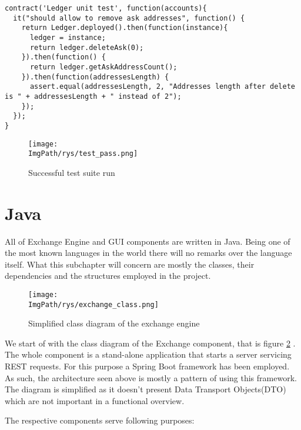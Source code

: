 \documentclass[a4paper,12pt,twoside,openany]{report}
\newcommand{\ImgPath}{.}
\begin{document}
\begin{lstlisting}
contract('Ledger unit test', function(accounts){
  it("should allow to remove ask addresses", function() {
    return Ledger.deployed().then(function(instance){
      ledger = instance;
      return ledger.deleteAsk(0);
    }).then(function() {
      return ledger.getAskAddressCount();
    }).then(function(addressesLength) {
      assert.equal(addressesLength, 2, "Addresses length after delete is " + addressesLength + " instead of 2");
    });
  });
}
\end{lstlisting}

\begin{figure}[!htbp]
	\begin{center}
\centering
\texttt{[image: \\ImgPath/rys/test\_pass.png]}
\end{center}
	\caption{Successful test suite run}
	\label{tests}
\end{figure}

\newpage

\section{Java}

All of Exchange Engine and GUI components are written in Java. Being one of the most known languages in the world there will no remarks over the language itself. What this subchapter will concern are mostly the classes, their dependencies and the structures employed in the project.

\begin{figure}[!htbp]
	\begin{center}
\centering
\texttt{[image: \\ImgPath/rys/exchange\_class.png]}
\end{center}
	\caption{Simplified class diagram of the exchange engine}
	\label{engine class}
\end{figure}

We start of with the class diagram of the Exchange component, that is figure \ref{engine class} . The whole component is a stand-alone application that starts a server servicing REST requests. For this purpose a Spring Boot framework has been employed. As such, the architecture seen above is mostly a pattern of using this framework. The diagram is simplified as it doesn't present Data Transport Objects(DTO) which are not important in a functional overview.

The respective components serve following purposes:
\end{document}

